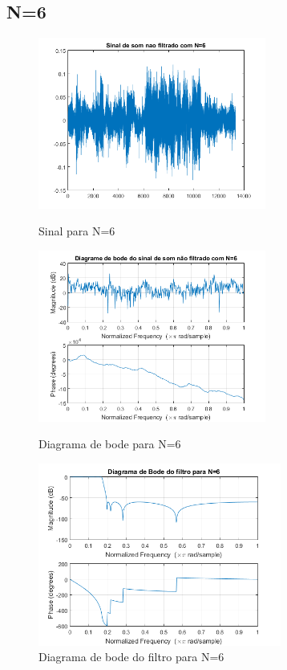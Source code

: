 \documentclass[11pt]{article}
\begin{document}
\subsection{N=6}
\begin{figure}[h]
\begin{center}
\begin{minipage}[b]{0.45\linewidth}
\includegraphics[width=7.5cm]{nfds6.png}
\caption{Sinal para N=6}
\label{figura8}
\end{minipage}
\begin{minipage}[b]{0.45\linewidth}
\includegraphics[width=7.5cm]{nfdb6.png}
\caption{Diagrama de bode para N=6}
\label{figura9}
\end{minipage}
\newline
\newline
\includegraphics[width=8cm]{filtro6.png}
\caption{Diagrama de bode do filtro para N=6}
\label{figura10}
\end{center}
\end{figure}
\end{document}
